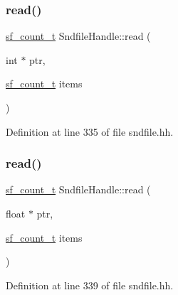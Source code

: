 \subsubsection{\texorpdfstring{read()}{read()}\hspace{0.1cm}{\footnotesize\ttfamily [2/4]}}
{\footnotesize\ttfamily \mbox{\hyperlink{sndfile_8h_af2b12fded74bc949f1f1f392a2af4892}{sf\+\_\+count\+\_\+t}} Sndfile\+Handle\+::read (\begin{DoxyParamCaption}\item[{int $\ast$}]{ptr,  }\item[{\mbox{\hyperlink{sndfile_8h_af2b12fded74bc949f1f1f392a2af4892}{sf\+\_\+count\+\_\+t}}}]{items }\end{DoxyParamCaption})\hspace{0.3cm}{\ttfamily [inline]}}



Definition at line 335 of file sndfile.\+hh.

\mbox{\label{class_sndfile_handle_aa2ee9aaafe7baa6b7e5d26e9dd2a0321}} 
\subsubsection{\texorpdfstring{read()}{read()}\hspace{0.1cm}{\footnotesize\ttfamily [3/4]}}
{\footnotesize\ttfamily \mbox{\hyperlink{sndfile_8h_af2b12fded74bc949f1f1f392a2af4892}{sf\+\_\+count\+\_\+t}} Sndfile\+Handle\+::read (\begin{DoxyParamCaption}\item[{float $\ast$}]{ptr,  }\item[{\mbox{\hyperlink{sndfile_8h_af2b12fded74bc949f1f1f392a2af4892}{sf\+\_\+count\+\_\+t}}}]{items }\end{DoxyParamCaption})\hspace{0.3cm}{\ttfamily [inline]}}



Definition at line 339 of file sndfile.\+hh.

\mbox{\label{class_sndfile_handle_a44892d06c66e34bfc5f1948ee58b43ac}} 
